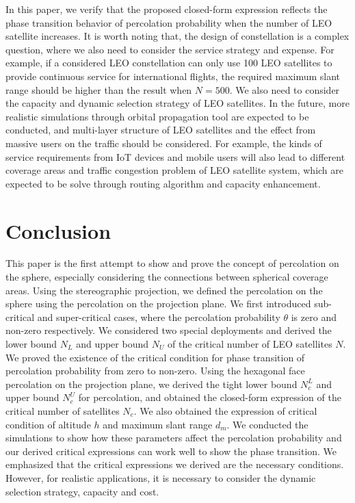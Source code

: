 \documentclass[final]{IEEEtran}
\begin{document}
In this paper, we verify that the proposed closed-form expression reflects the phase transition behavior of percolation probability when the number of LEO satellite increases. It is worth noting that, the design of constellation is a complex question, where we also need to consider the service strategy and expense. For example, if a considered LEO constellation can only use 100 LEO satellites to provide continuous service for international flights, the required maximum slant range should be higher than the result when $N=500$. We also need to consider the capacity and dynamic selection 
strategy of LEO satellites. In the future, more realistic simulations through orbital propagation tool are expected to be conducted, and multi-layer structure of LEO satellites and the effect from massive users on the traffic should be considered. For example, the kinds of service requirements from IoT devices and mobile users will also lead to different coverage areas and traffic congestion problem of LEO satellite system, which are expected to be solve through routing algorithm and capacity enhancement.
\section{Conclusion}
This paper is the first attempt to show and prove the concept of percolation on the sphere, especially considering the connections between spherical coverage areas. Using the stereographic projection, we defined the percolation on the sphere using the percolation on the projection plane. We first introduced sub-critical and super-critical cases, where the percolation probability $\theta$ is zero and non-zero respectively. We considered two special deployments and derived the lower bound $N_L$ and upper bound $N_U$ of the critical number of LEO satellites $N$. We proved the existence of the critical condition for phase transition of percolation probability from zero to non-zero. Using the hexagonal face percolation on the projection plane, we derived the tight lower bound $N_c^L$ and upper bound $N_c^U$ for percolation, and obtained the closed-form expression of the critical number of satellites $N_c$. We also obtained the expression of critical condition of altitude $h$ and maximum slant range $d_m$. We conducted the simulations to show how these parameters affect the percolation probability and our derived critical expressions can work well to show the phase transition. We emphasized that the critical expressions we derived are the necessary conditions. However, for realistic applications, it is necessary to consider the dynamic selection strategy, capacity and cost.
\appendices
\end{document}
